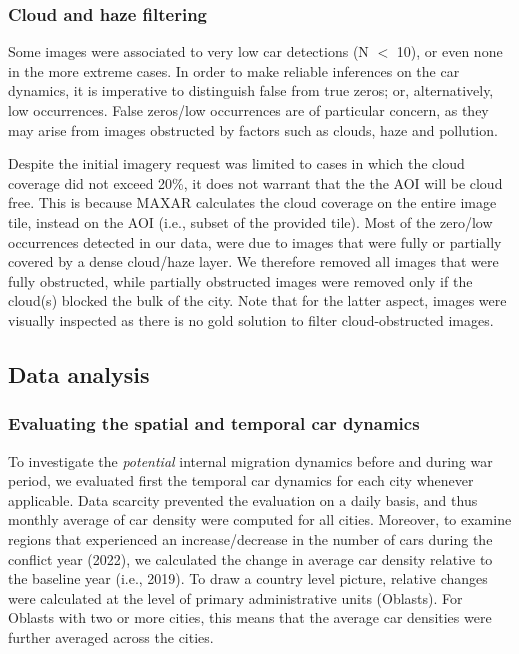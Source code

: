 \documentclass[sn-basic]{sn-jnl}%
\begin{document}
\subsubsection{Cloud and haze filtering} \label{MMS4-3}
Some images were associated to very low car detections (N $<$ 10), or even none in the more extreme cases. In order to make reliable inferences on the car dynamics, it is imperative to distinguish false from true zeros; or, alternatively, low occurrences. False zeros/low occurrences are of particular concern, as they may arise from images obstructed by factors such as clouds, haze and pollution. 

Despite the initial imagery request was limited to cases in which the cloud coverage did not exceed 20\%, it does not warrant that the 
the AOI will be cloud free. This is because MAXAR calculates the cloud coverage on the entire image tile, instead on the AOI (i.e., subset of the provided tile). Most of the zero/low occurrences detected in our data, were due to images that were fully or partially covered by a dense cloud/haze layer. We therefore removed all images that were fully obstructed, while partially obstructed images were removed only if the cloud(s) blocked the bulk of the city. Note that for the latter aspect, images were visually inspected as there is no gold solution to filter cloud-obstructed images.


\subsection{Data analysis} \label{MMS5}

\subsubsection{Evaluating the spatial and temporal car dynamics} \label{MMS5-1}

To investigate the \textit{potential} internal migration dynamics before and during war period, we evaluated first the temporal car dynamics for each city whenever applicable. Data scarcity prevented the evaluation on a daily basis, and thus monthly average of car density were computed for all cities. Moreover, to examine regions that experienced an increase/decrease in the number of cars during the conflict year (2022), we calculated the change in average car density relative to the baseline year (i.e., 2019). To draw a country level picture, relative changes were calculated at the level of primary administrative units (Oblasts). For Oblasts with two or more cities, this means that the average car densities were further averaged across the cities. 
\end{document}
